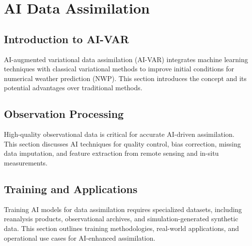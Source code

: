 \chapter{AI Data Assimilation}

\section{Introduction to AI-VAR}
AI-augmented variational data assimilation (AI-VAR) integrates machine learning techniques with classical variational methods to improve initial conditions for numerical weather prediction (NWP). This section introduces the concept and its potential advantages over traditional methods.

\section{Observation Processing}
High-quality observational data is critical for accurate AI-driven assimilation. This section discusses AI techniques for quality control, bias correction, missing data imputation, and feature extraction from remote sensing and in-situ measurements.

\section{Training and Applications}
Training AI models for data assimilation requires specialized datasets, including reanalysis products, observational archives, and simulation-generated synthetic data. This section outlines training methodologies, real-world applications, and operational use cases for AI-enhanced assimilation.
